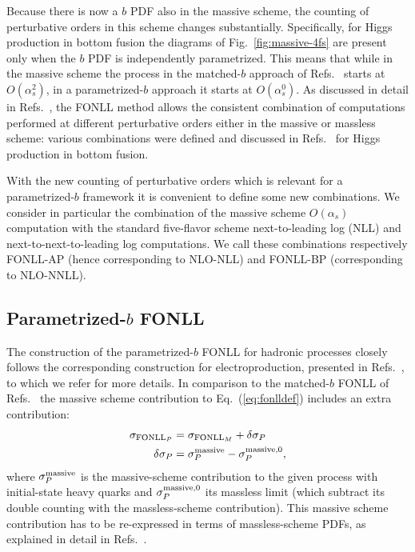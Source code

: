 Because there is now a $b$ PDF also in the massive scheme, the
counting of perturbative orders in this scheme
changes substantially. Specifically, for Higgs production in bottom
fusion the diagrams of Fig.~\ref{fig:massive-4fs} are present only
when the $b$ PDF is independently parametrized. This means that while 
in the
massive scheme the process in the matched-$b$ approach of
Refs.~\cite{Forte:2015hba,Forte:2016sja}  starts at $O(\alpha_s^2)$,
in a parametrized-$b$ approach it starts at 
$O(\alpha_s^0)$. As discussed in detail in
Refs.~\cite{Forte:2010ta,Forte:2015hba,Forte:2016sja},
the FONLL method allows the  consistent combination of computations performed
at different perturbative orders either in the massive or massless
scheme: various combinations were defined and discussed  in
Refs.~\cite{Forte:2015hba,Forte:2016sja} for Higgs production in
bottom fusion.

With the new counting of perturbative orders which is relevant for a
parametrized-$b$ framework it is convenient to define some new
combinations. We  consider in particular the combination of 
the massive scheme $O(\alpha_s)$ computation  with the standard
five-flavor scheme next-to-leading log (NLL) and
next-to-next-to-leading log  computations. We  call these
combinations respectively FONLL-AP (hence corresponding to NLO-NLL)
and FONLL-BP (corresponding to  NLO-NNLL).


\subsection{Parametrized-$b$ FONLL}
\label{sec:parbfonll}

The construction of the parametrized-$b$ FONLL for hadronic processes
closely follows the corresponding construction for electroproduction,
presented in Refs.~\cite{Ball:2015tna,Ball:2015dpa}, to which we refer
for more details. In comparison to the matched-$b$ FONLL of
Refs.~\cite{Forte:2015hba,Forte:2016sja} the massive scheme
contribution to Eq.~(\ref{eq:fonlldef}) includes an extra contribution:
\begin{align}
  \label{eq:delta-i}
  \sigma_{\text{FONLL}_P} &= \sigma_{\text{FONLL}_M} +
  \delta\sigma_P\nonumber\\ 
  \quad \quad \delta\sigma_P &= \sigma^{\rm massive}_{P} - \sigma^{{\rm
      massive},0}_{P},
\end{align}
where $\sigma^{\rm massive}_{P}$ is the massive-scheme contribution to
the given process with initial-state heavy quarks and $\sigma^{{\rm
      massive},0}_{P}$ its massless limit (which subtract its double
counting with the massless-scheme contribution). This massive scheme
contribution has to be re-expressed in terms of massless-scheme PDFs,
as explained in detail in
Refs.~\cite{Cacciari:1998it,Forte:2010ta,Ball:2015tna,Ball:2015dpa,Forte:2015hba,Forte:2016sja}.

